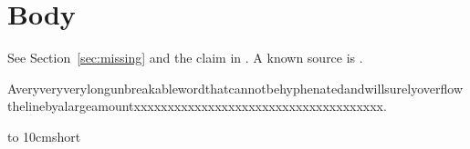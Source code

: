 \section{Body}
\label{chap:dup}

See Section~\ref{sec:missing} and the claim in \citep{nokey2020}.
A known source is \citep{knuth1984texbook}.

Averyveryverylongunbreakablewordthatcannotbehyphenatedandwillsurelyoverflowthelinebyalargeamountxxxxxxxxxxxxxxxxxxxxxxxxxxxxxxxxxxxxx.

\vbox to 10cm{short}
